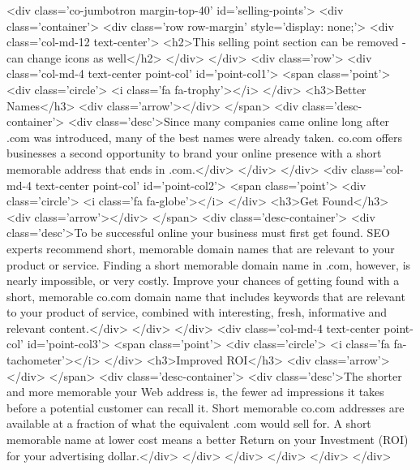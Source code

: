     <div class='co-jumbotron margin-top-40' id='selling-points'>
        <div class='container'>
            <div class='row row-margin' style='display: none;'>
                <div class='col-md-12 text-center'>
                    <h2>This selling point section can be removed - can change icons as well</h2>
                </div>
            </div>
            <div class='row'>
                <div class='col-md-4 text-center point-col' id='point-col1'>
                    <span class='point'>
                        <div class='circle'>
                            <i class='fa fa-trophy'></i>
                        </div>
                        <h3>Better Names</h3>
                        <div class='arrow'></div>
                    </span>
                    <div class='desc-container'>
                        <div class='desc'>Since many companies came online long after .com was introduced, many of the best names were already taken.  co.com offers businesses a second opportunity to brand your online presence with a short memorable address that ends in .com.</div>
                    </div>
                </div>
                <div class='col-md-4 text-center point-col' id='point-col2'>
                    <span class='point'>
                        <div class='circle'>
                            <i class='fa fa-globe'></i>
                        </div>
                        <h3>Get Found</h3>
                        <div class='arrow'></div>
                    </span>
                    <div class='desc-container'>
                        <div class='desc'>To be successful online your business must first get found.  SEO experts recommend short, memorable domain names that are relevant to your product or service.  Finding a short memorable domain name in .com, however, is nearly impossible, or very costly. Improve your chances of getting found with a short, memorable co.com domain name that includes keywords that are relevant to your product of service, combined with interesting, fresh, informative and relevant content.</div>
                    </div>
                </div>
                <div class='col-md-4 text-center point-col' id='point-col3'>
                    <span class='point'>
                        <div class='circle'>
                            <i class='fa fa-tachometer'></i>
                        </div>
                        <h3>Improved ROI</h3>
                        <div class='arrow'></div>
                    </span>
                    <div class='desc-container'>
                        <div class='desc'>The shorter and more memorable your Web address is, the fewer ad impressions it takes before a potential customer can recall it.   Short memorable co.com addresses are available at a fraction of what the equivalent .com would sell for.  A short memorable name at lower cost means a better Return on your Investment (ROI) for your advertising dollar.</div>
                    </div>
                </div>
            </div>
        </div>
    </div>


